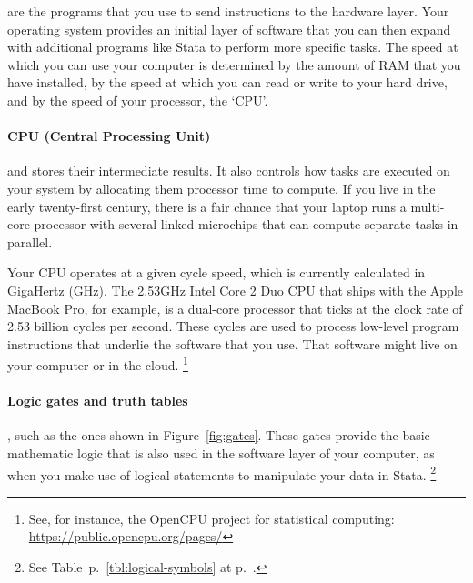  are the programs that you use to send instructions to the hardware layer. Your operating system provides an initial layer of software that you can then expand with additional programs like Stata to perform more specific tasks. The speed at which you can use your computer is determined by the amount of RAM that you have installed, by the speed at which you can read or write to your hard drive, and by the speed of your processor, the `CPU'.%
%

%
\paragraph{CPU (Central Processing Unit)}%

 and stores their intermediate results. It also controls how tasks are executed on your system by allocating them processor time to compute. If you live in the early twenty-first century, there is a fair chance that your laptop runs a multi-core processor with several linked microchips that can compute separate tasks in parallel.%

Your CPU operates at a given cycle speed, which is currently calculated in GigaHertz (GHz). The 2.53GHz Intel Core 2 Duo CPU that ships with the Apple MacBook Pro, for example, is a dual-core processor that ticks at the clock rate of 2.53 billion cycles per second. These cycles are used to process low-level program instructions that underlie the software that you use. That software might live on your computer or in the cloud.%
  \footnote{See, for instance, the OpenCPU project for statistical computing: \url{https://public.opencpu.org/pages/}}%

%
\paragraph{Logic gates and truth tables}%
  
, such as the ones shown in Figure~\ref{fig:gates}. These gates provide the basic mathematic logic that is also used in the software layer of your computer, as when you make use of logical statements to manipulate your data in Stata.%
  \footnote{See Table~p.~\ref{tbl:logical-symbols} at p.~\pageref{tbl:logical-symbols}.}%
%

